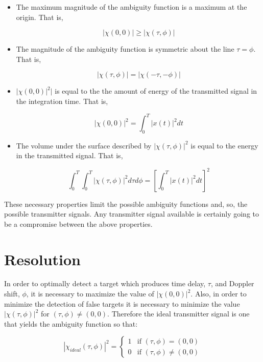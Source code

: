 \documentclass[a4paper]{report}
\numberwithin{equation}{chapter}
\begin{document}
\begin{itemize}
\item{The maximum magnitude of the ambiguity function is a maximum at the origin. That is,

\begin{equation}
|\chi(0, 0)| \geq |\chi(\tau, \phi)|
\end{equation}}
\item{The magnitude of the ambiguity function is symmetric about the line $\tau = \phi$. That is,

\begin{equation}
|\chi(\tau, \phi)| = |\chi(-\tau, -\phi)|
\end{equation}}

\item{$|\chi(0, 0)|^2|$ is equal to the the amount of energy of the transmitted signal in the integration time. That is,

\begin{equation}
|\chi(0, 0)|^2 = \int_0^T |x(t)|^2 dt
\end{equation}}

\item{The volume under the surface described by $|\chi(\tau, \phi)|^2$ is equal to the energy in the transmitted signal. That is,

\begin{equation}
\int_0^T \int_0^T|\chi(\tau, \phi)|^2 d\tau d\phi = \left[\int_0^T |x(t)|^2 dt \right]^2
\end{equation}}
\end{itemize}

These necessary properties limit the possible ambiguity functions and, so, the possible transmitter signals. Any transmitter signal available is certainly going to be a compromise between the above properties.

\section[Resolution]{Resolution}

In order to optimally detect a target which produces time delay, $\tau$, and Doppler shift, $\phi$, it is necessary to maximize the value of $|\chi(0, 0)|^2$. Also, in order to minimize the detection of false targets it is necessary to minimize the value $|\chi(\tau, \phi)|^2$ for $(\tau, \phi) \ne (0, 0)$. Therefore the ideal transmitter signal is one that yields the ambiguity function so that:

\begin{equation}
|\chi_{ideal}(\tau, \phi)|^2 = 
\begin{cases}
1 & \text{if } (\tau, \phi) = (0, 0)\\
0 & \text{if } (\tau, \phi) \ne (0, 0)
\end{cases}
\end{equation}
\end{document}
